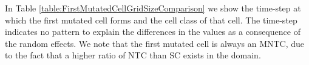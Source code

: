 \documentclass[\main/thesis.tex]{subfiles}
\begin{document}
In Table \ref{table:FirstMutatedCellGridSizeComparison} we show the time-step at which the first mutated cell forms and the cell class of that cell. The time-step indicates no pattern to explain the differences in the values as a consequence of the random effects. We note that the first mutated cell is always an MNTC, due to the fact that a higher ratio of NTC than SC exists in the domain.
\begin{table}[H]
\centering
{}
\caption{In this table we compare the time-step the first mutated cell forms and the cell class that cell belongs to between the different grid sizes.}
\label{table:FirstMutatedCellGridSizeComparison} 
\end{table}
\end{document}

